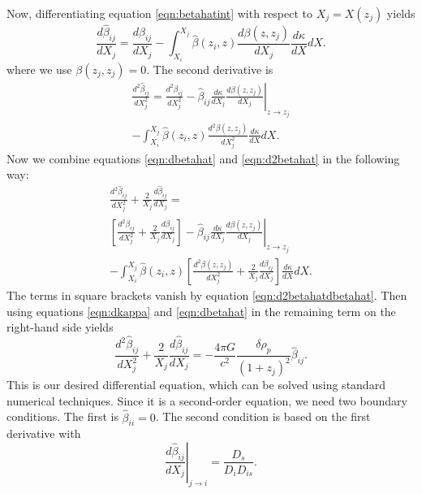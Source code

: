 \documentclass{emulateapj}
\newcommand\drho{\delta\rho}
\newcommand\betahat{\hat{\beta}}
\begin{document}
Now, differentiating equation \ref{eqn:betahatint} with respect to $X_j = X(z_j)$ yields
\begin{equation}
\label{eqn:dbetahat}
\frac{d \betahat_{i j}}{d X_j} = \frac{d\beta_{i j}}{d X_j} - \int_{X_i}^{X_j} \betahat(z_i, z) \frac{d \beta(z, z_j)}{d X_j} \frac{d \kappa}{d X} d X. 
\end{equation}
where we use $\beta(z_j, z_j) = 0$.  The second derivative is
\begin{multline}
\label{eqn:d2betahat}
\frac{d^2 \betahat_{i j}}{d X_j^2} = \frac{d^2 \beta_{i j}}{d X_j^2} -  \betahat_{i j} \frac{d \kappa}{d X_j} \left. \frac{d \beta(z, z_j)}{d X_j}  \right|_{z \rightarrow z_j} \\
 - \int_{X_i}^{X_j} \betahat(z_i, z) \frac{d^2 \beta(z, z_j)}{d X_j^2} \frac{d \kappa}{d X} d X.
\end{multline}
Now we combine equations \ref{eqn:dbetahat} and \ref{eqn:d2betahat} in the following way:
\begin{multline}
\frac{d^2 \betahat_{i j}}{d X_j^2} + \frac{2}{X_j} \frac{d \betahat_{i j}}{d X_j} =  \\
\left[\frac{d^2 \beta_{i j}}{d X_j^2}  + \frac{2}{X_j} \frac{d \beta_{i j}}{d X_j}\right]
- \betahat_{i j} \frac{d \kappa}{d X_j} \left. \frac{d \beta(z, z_j)}{d X_j}  \right|_{z \rightarrow z_j} \\ 
 - \int_{X_i}^{X_j} \betahat(z_i, z)\left[ \frac{d^2 \beta(z, z_j)}{d X_j^2}  + \frac{2}{X_j} \frac{d \beta_{i j}}{dX_j}\right] \frac{d \kappa}{d X} d X.
\label{eqn:betahatcombine}
\end{multline}
The terms in square brackets vanish by equation \ref{eqn:d2betahatdbetahat}. Then using equations \ref{eqn:dkappa} and \ref{eqn:dbetahat} in the remaining term on the right-hand side yields
\begin{equation}
\frac{d^2 \betahat_{i j}}{d X_j^2} + \frac{2}{X_j}\frac{d \betahat_{i j}}{d X_j} = - \frac{4 \pi G}{c^2} \frac{\drho_p}{(1 + z_j)^2} \betahat_{i j}.
\end{equation}
This is our desired differential equation, which can be solved using standard numerical techniques.  Since it is a second-order equation, we need two boundary conditions. The first is $\betahat_{i i} = 0$. The second condition is based on the first derivative with 
\begin{equation}
\left. \frac{d \betahat_{i j}}{d X_j} \right|_{j \rightarrow i} = \frac{D_s}{D_i D_{i s}}.
\end{equation}
\end{document}
